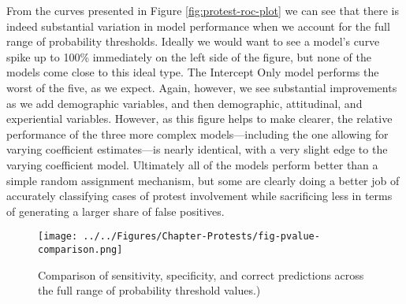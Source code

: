 From the curves presented in Figure \ref{fig:protest-roc-plot} we can see that there is indeed substantial variation in model performance when we account for the full range of probability thresholds. Ideally we would want to see a model's curve spike up to 100\% immediately on the left side of the figure, but none of the models come close to this ideal type. The Intercept Only model performs the worst of the five, as we expect. Again, however, we see substantial improvements as we add demographic variables, and then demographic, attitudinal, and experiential variables. However, as this figure helps to make clearer, the relative performance of the three more complex models---including the one allowing for varying coefficient estimates---is nearly identical, with a very slight edge to the varying coefficient model. Ultimately all of the models perform better than a simple random assignment mechanism, but some are clearly doing a better job of accurately classifying cases of protest involvement while sacrificing less in terms of generating a larger share of false positives.

\begin{figure}[t]
	\centering\texttt{[image: ../../Figures/Chapter-Protests/fig-pvalue-comparison.png]}
	\caption{Comparison of sensitivity, specificity, and correct predictions across the full range of probability threshold values.)}
	\label{fig:protest-pvalue-compare}
\end{figure}

